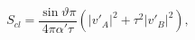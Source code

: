 \begin{equation}
S_{cl}=\frac{\sin \vartheta \pi }{4\pi \alpha '\tau }\left( |v'_{A}|^{2}+\tau
  ^{2}|v'_{B}|^{2}\right), 
\end{equation}

